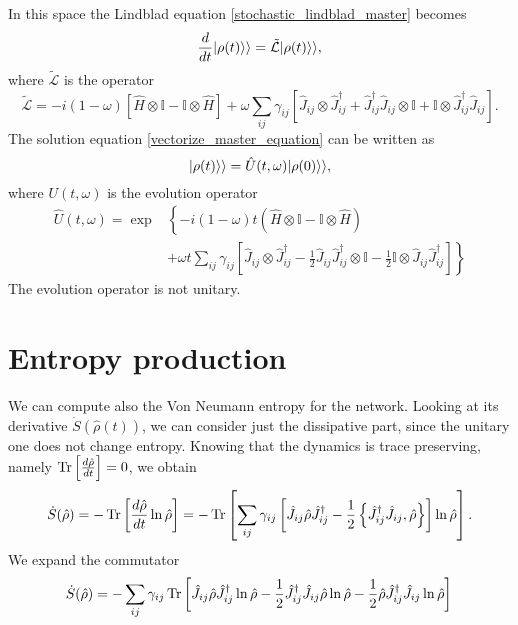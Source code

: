 In this space the Lindblad equation \eqref{stochastic_lindblad_master} becomes
\begin{equation}\label{vectorize_master_equation}
        \frac{d}{dt}\lvert\rho(t)\rangle\rangle = \tilde{\mathcal{L}}\lvert\rho(t)\rangle\rangle,
    \end{equation}
    where $\tilde{\mathcal{L}}$ is the operator 
    \begin{equation}
        \tilde{\mathcal{L}}=-i(1-\omega)\left[\hat H\otimes\mathbb{I}-\mathbb{I}\otimes\hat H\right]+\omega\sum_{ij}\gamma_{ij}\left[\hat J_{ij}\otimes\hat J^\dagger_{ij} + \hat J_{ij}^\dagger \hat J_{ij}\otimes\mathbb{I} +\mathbb{I}\otimes\hat J_{ij}^\dagger \hat J_{ij}\right].
\end{equation}
The solution equation \eqref{vectorize_master_equation} can be written as
\begin{equation}
    \lvert\rho(t)\rangle\rangle = \hat U(t,\omega)\lvert\rho(0)\rangle\rangle,
\end{equation}
where $U(t,\omega)$ is the evolution operator \cite{Domino}
\begin{equation}
    \begin{split}
            \hat U(t,\omega) = \exp&\left\{-i\left(1-\omega\right)t\left(\hat H\otimes\mathbb{I}-\mathbb{I}\otimes\hat H\right)\right.\\
            &+\left.\omega t\sum_{ij}\gamma_{ij}\left[ \hat J_{ij}\otimes\hat J^\dagger_{ij}-\frac{1}{2}\hat J_{ij}\hat J^\dagger_{ij}\otimes\mathbb{I}-\frac{1}{2}\mathbb{I}\otimes\hat J_{ij}\hat J^\dagger_{ij}\right]\right\}
        \end{split}
\end{equation}
The evolution operator is not unitary.

\section{Entropy production}
We can compute also the Von Neumann entropy for the network. 
Looking at its derivative $\dot S(\hat\rho(t))$, we can consider just the dissipative part, since the unitary one does not change entropy. Knowing that the dynamics is trace preserving, namely $\operatorname{Tr}\left[\frac{d\hat\rho}{dt}\right] = 0$, we obtain
\begin{equation}
        \dot S(\hat\rho) = -\operatorname{Tr}\left[\frac{d\hat\rho}{dt}\ln\hat\rho\right] = -\operatorname{Tr}\left[\sum_{ij}\gamma_{ij}\left[\hat J_{ij} \hat\rho\hat J_{ij}^\dagger -\frac{1}{2} \left\{ \hat J_{ij}^\dagger \hat J_{ij}, \hat\rho\right\}\right]\ln\hat\rho\right].\\
\end{equation}
We expand the commutator
\begin{equation}
    \dot S(\hat\rho) =-\sum_{ij}\gamma_{ij}\operatorname{Tr}\left[\hat J_{ij} \hat\rho\hat J_{ij}^\dagger\ln\hat\rho -\frac{1}{2}\hat J_{ij}^\dagger \hat J_{ij}\hat\rho \ln\hat\rho-\frac{1}{2} \hat\rho\hat J_{ij}^\dagger \hat J_{ij}\ln\hat\rho\right]\\
\end{equation}
        
